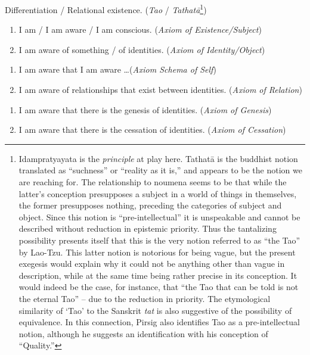 \documentclass[pra,twocolumn,groupedaddress,10pt]{revtex4}
\theoremstyle{definition}
\begin{document}
\begin{enumerate}[label={[\textbf{\arabic*}]},start=0]
	\item Differentiation / Relational existence. (\emph{Tao} / \emph{Tathat\={a}}\footnote{Idampratyayata is the \emph{principle} at play here. Tathat\={a} is the buddhist notion translated as ``suchness'' or ``reality as it is,'' and appears to be the notion we are reaching for. The relationship to noumena seems to be that while the latter's conception presupposes a subject in a world of things in themselves, the former presupposes nothing, preceding the categories of subject and object. Since this notion is ``pre-intellectual'' it is unspeakable and cannot be described without reduction in epistemic priority. Thus the tantalizing possibility presents itself that this is the very notion referred to as ``the Tao'' by Lao-Tzu\cite{taoteching}. This latter notion is notorious for being vague, but the present exegesis would explain why it could not be anything other than vague in description, while at the same time being rather precise in its conception. It would indeed be the case, for instance, that ``the Tao that can be told is not the eternal Tao'' -- due to the reduction in priority. The etymological similarity of `Tao' to the Sanskrit \emph{tat} is also suggestive of the possibility of equivalence. In this connection, Pirsig\cite{pirsig} also identifies Tao as a pre-intellectual notion, although he suggests an identification with his conception of ``Quality.''})
	\item \begin{enumerate}
			\item I am / I am aware / I am conscious. (\emph{Axiom of Existence/Subject})
			\item I am aware of something / of identities. (\emph{Axiom of Identity/Object})
		\end{enumerate}
	\item \begin{enumerate}
			\item I am aware that I am aware \ldots (\emph{Axiom Schema of Self})
			\item I am aware of relationships that exist between identities. (\emph{Axiom of Relation})
		\end{enumerate}
	\item \begin {enumerate}
			\item I am aware that there is the genesis of identities. (\emph{Axiom of Genesis})
			\item I am aware that there is the cessation of identities. (\emph{Axiom of Cessation})

\end{enumerate}
\end{enumerate}
\end{document}
